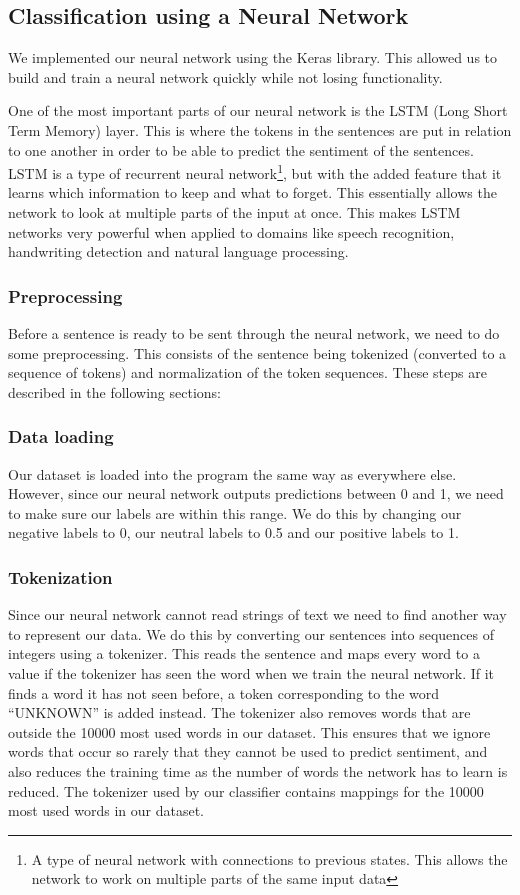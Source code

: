 \subsection{Classification using a Neural Network}
We implemented our neural network using the Keras\cite{Keras} library. 
This allowed us to build and train a neural network quickly while not losing functionality.

One of the most important parts of our neural network is the LSTM (Long Short Term Memory) layer. 
This is where the tokens in the sentences are put in relation to one another in order to be able to predict the sentiment of the sentences.
LSTM is a type of recurrent neural network\footnote{A type of neural network with connections to previous states. This allows the network to work on multiple parts of the same input data}, but with the added feature that it learns which information to keep and what to forget.
This essentially allows the network to look at multiple parts of the input at once. 
This makes LSTM networks very powerful when applied to domains like speech recognition, handwriting detection and natural language processing.

\subsubsection{Preprocessing}
Before a sentence is ready to be sent through the neural network, we need to do some preprocessing. This consists of the sentence being tokenized (converted to a sequence of tokens) and normalization of the token sequences. These steps are described in the following sections:

\subsubsection{Data loading}
Our dataset is loaded into the program the same way as everywhere else. However, since our neural network outputs predictions between 0 and 1, we need to make sure our labels are within this range.
We do this by changing our negative labels to 0, our neutral labels to 0.5 and our positive labels to 1.

\subsubsection{Tokenization}
Since our neural network cannot read strings of text we need to find another way to represent our data. We do this by converting our sentences into sequences of integers using a tokenizer. This reads the sentence and maps every word to a value if the tokenizer has seen the word when we train the neural network. If it finds a word it has not seen before, a token corresponding to the word “UNKNOWN” is added instead. The tokenizer also removes words that are outside the 10000 most used words in our dataset. This ensures that we ignore words that occur so rarely that they cannot be used to predict sentiment, and also reduces the training time as the number of words the network has to learn is reduced.
The tokenizer used by our classifier contains mappings for the 10000 most used words in our dataset.

